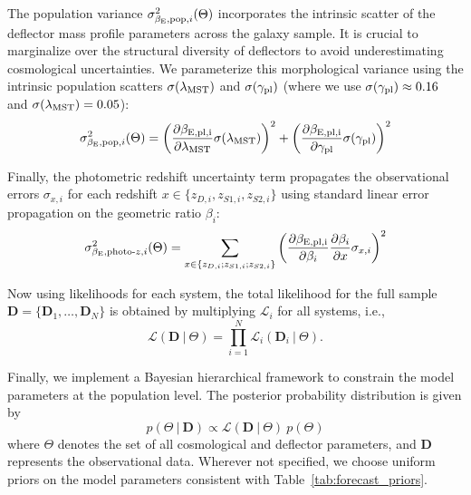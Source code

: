 \documentclass[a4paper,11pt]{article}
\begin{document}
The population variance $\sigma_{\beta_{\rm E},\text{pop}, i}^2(\Theta)$ incorporates the intrinsic scatter of the deflector mass profile parameters across the galaxy sample. It is crucial to marginalize over the structural diversity of deflectors \citep{Birrer:2020} to avoid underestimating cosmological uncertainties. We parameterize this morphological variance using the intrinsic population scatters $\sigma(\lambda_{\rm MST})$ and $\sigma(\gamma_{\rm pl})$ (where we use $\sigma(\gamma_{\rm pl}) \approx 0.16$ \cite{Auger:2010} and $\sigma(\lambda_{\rm MST}) = 0.05$):
\begin{equation}
    \sigma_{\beta_{\rm E},\text{pop}, i}^2(\Theta) = \left( \frac{\partial \beta_{\rm E, pl, i}}{\partial \lambda_{\rm MST}} \sigma(\lambda_{\rm MST}) \right)^2 + \left( \frac{\partial \beta_{\rm E, pl, i}}{\partial \gamma_{\rm pl}} \sigma(\gamma_{\rm pl}) \right)^2
\end{equation}

Finally, the photometric redshift uncertainty term propagates the observational errors $\sigma_{x,i}$ for each redshift $x \in \{z_{D,i}, z_{S1,i}, z_{S2,i}\}$ using standard linear error propagation on the geometric ratio $\beta_i$:
\begin{equation}\label{eqn:sigma_photo-z}
    \sigma_{\beta_{\rm E},\text{photo-}z, i}^2(\Theta) = \sum_{x \in \{z_{D,i}; z_{S1,i}; z_{S2,i}\}} \left( \frac{\partial \beta_{\rm E, pl, i}}{\partial \beta_i} \frac{\partial \beta_i}{\partial x} \sigma_{x, i} \right)^2
\end{equation}

Now using likelihoods for each system, the total likelihood for the full sample $\mathbf{D} = \{\mathbf{D}_1, \dots, \mathbf{D}_N\}$ is obtained by multiplying $\mathcal{L}_i$ for all systems, i.e.,
\begin{equation}
    \mathcal{L}(\mathbf{D} \ | \ \Theta ) = \prod_{i=1}^{N}{\mathcal{L}_i(\mathbf{D}_i \ | \ \Theta)}.
\end{equation}

Finally, we implement a Bayesian hierarchical framework to constrain the model parameters at the population level. The posterior probability distribution is given by
\begin{equation}
    p(\Theta \ | \  \mathbf{D}) \propto \mathcal{L}(\mathbf{D} \ | \ \Theta ) \ p(\Theta)
\end{equation}
where $\Theta$ denotes the set of all cosmological and deflector parameters, and $\mathbf{D}$ represents the observational data. Wherever not specified, we choose uniform priors on the model parameters consistent with Table~\ref{tab:forecast_priors}.
\end{document}
